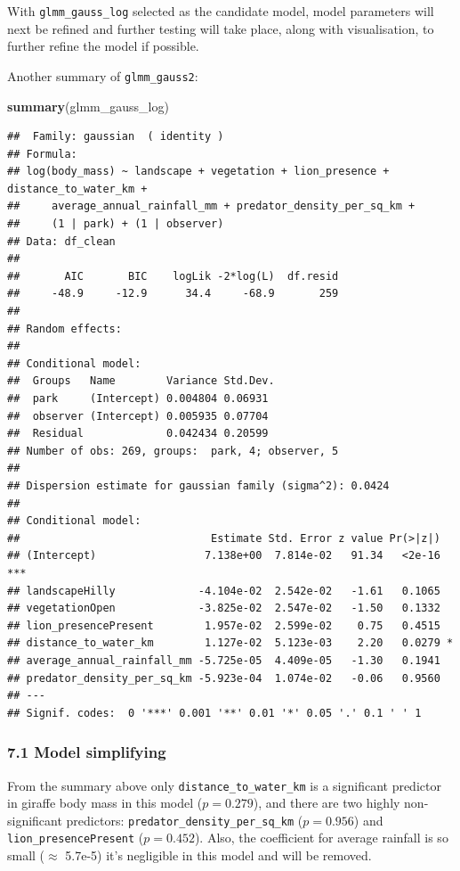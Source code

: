 \documentclass[
]{article}
\newenvironment{Shaded}{\begin{snugshade}}{\end{snugshade}}
\newcommand{\FunctionTok}[1]{\textcolor[rgb]{0.13,0.29,0.53}{\textbf{#1}}}
\newcommand{\NormalTok}[1]{#1}
\begin{document}
With \texttt{glmm\_gauss\_log} selected as the candidate model, model
parameters will next be refined and further testing will take place,
along with visualisation, to further refine the model if possible.

Another summary of \texttt{glmm\_gauss2}:

\begin{Shaded}
\begin{Highlighting}[]
\FunctionTok{summary}\NormalTok{(glmm\_gauss\_log)}
\end{Highlighting}
\end{Shaded}

\begin{verbatim}
##  Family: gaussian  ( identity )
## Formula:          
## log(body_mass) ~ landscape + vegetation + lion_presence + distance_to_water_km +  
##     average_annual_rainfall_mm + predator_density_per_sq_km +  
##     (1 | park) + (1 | observer)
## Data: df_clean
## 
##       AIC       BIC    logLik -2*log(L)  df.resid 
##     -48.9     -12.9      34.4     -68.9       259 
## 
## Random effects:
## 
## Conditional model:
##  Groups   Name        Variance Std.Dev.
##  park     (Intercept) 0.004804 0.06931 
##  observer (Intercept) 0.005935 0.07704 
##  Residual             0.042434 0.20599 
## Number of obs: 269, groups:  park, 4; observer, 5
## 
## Dispersion estimate for gaussian family (sigma^2): 0.0424 
## 
## Conditional model:
##                              Estimate Std. Error z value Pr(>|z|)    
## (Intercept)                 7.138e+00  7.814e-02   91.34   <2e-16 ***
## landscapeHilly             -4.104e-02  2.542e-02   -1.61   0.1065    
## vegetationOpen             -3.825e-02  2.547e-02   -1.50   0.1332    
## lion_presencePresent        1.957e-02  2.599e-02    0.75   0.4515    
## distance_to_water_km        1.127e-02  5.123e-03    2.20   0.0279 *  
## average_annual_rainfall_mm -5.725e-05  4.409e-05   -1.30   0.1941    
## predator_density_per_sq_km -5.923e-04  1.074e-02   -0.06   0.9560    
## ---
## Signif. codes:  0 '***' 0.001 '**' 0.01 '*' 0.05 '.' 0.1 ' ' 1
\end{verbatim}

\subsubsection{7.1 Model simplifying}\label{model-simplifying}

From the summary above only \texttt{distance\_to\_water\_km} is a
significant predictor in giraffe body mass in this model
(\(p = 0.279\)), and there are two highly non-significant predictors:
\texttt{predator\_density\_per\_sq\_km} (\(p = 0.956\)) and
\texttt{lion\_presencePresent} (\(p = 0.452\)). Also, the coefficient
for average rainfall is so small (\(\approx\) 5.7e-5) it's negligible in
this model and will be removed.
\end{document}
